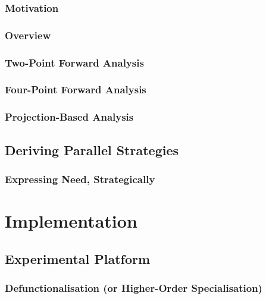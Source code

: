 \documentclass[dottedtoc, headinclude, footinclude=true, a4paper]{scrreprt}
\begin{document}
    

    \section{Motivation}
    

    \section{Overview}
    

    \section{Two-Point Forward Analysis}
    \label{sec:twoPoint}

    \section{Four-Point Forward Analysis}
    \label{sec:fourPoint}

    \section{Projection-Based Analysis}
    \label{sec:projections}
    


\chapter{Deriving Parallel Strategies}
    \section{Expressing Need, Strategically}
    \label{sec:derivations}
    
    
\part{Implementation}
\chapter{Experimental Platform}

    

    \section{Defunctionalisation (or Higher-Order Specialisation)}
    \label{sec:defunctionalisation}
    
\end{document}
